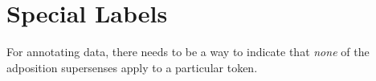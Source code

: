 \section{Special Labels}\label{sec:special}

For annotating data, there needs to be a way to indicate that \emph{none} 
of the adposition supersenses apply to a particular token. 

